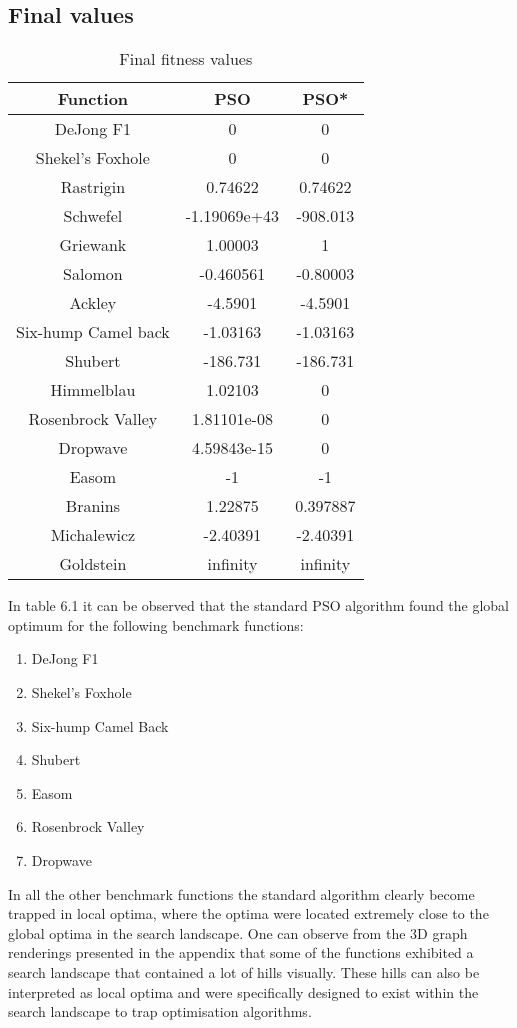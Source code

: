 \subsection{Final values}
\begin{table}[h]
\label{tbl:fitnessValues}
\begin{center}
	\begin{tabular}{| c | c | c |}
	\hline
	Function & PSO & PSO*\\  \hline
	DeJong F1 & 0 & 0 \\ \hline
	Shekel's Foxhole & 0 & 0 \\ \hline
	Rastrigin & 0.74622  & 0.74622\\ \hline
	Schwefel & -1.19069e+43  & -908.013\\ \hline
	Griewank & 1.00003 & 1 \\ \hline
	Salomon & -0.460561 & -0.80003 \\ \hline
	Ackley & -4.5901 & -4.5901 \\ \hline
	Six-hump Camel back & -1.03163 & -1.03163 \\ \hline
	Shubert & -186.731 & -186.731 \\ \hline
	Himmelblau & 1.02103 & 0 \\ \hline
	Rosenbrock Valley & 1.81101e-08 & 0 \\ \hline
	Dropwave & 4.59843e-15 & 0 \\ \hline
	Easom & -1 & -1 \\ \hline
	Branins & 1.22875 & 0.397887 \\ \hline
	Michalewicz & -2.40391 & -2.40391 \\ \hline
	Goldstein & infinity  & infinity\\ \hline
	\end{tabular}
\end{center}
\caption{Final fitness values}
\end{table}
In table 6.1 it can be observed that the standard PSO algorithm found the global optimum for the following benchmark functions:
\begin{enumerate}
\item DeJong F1 
\item Shekel's Foxhole
\item Six-hump Camel Back
\item Shubert
\item Easom
\item Rosenbrock Valley
\item Dropwave
\end{enumerate}
In all the other benchmark functions the standard algorithm clearly become trapped in local optima, where the optima were located extremely close to the global optima in the search landscape. One can observe from the 3D graph renderings presented in the appendix that some of the functions exhibited a search landscape that contained a lot of hills visually. These hills can also be interpreted as local optima and were specifically designed to exist within the search landscape to trap optimisation algorithms.

